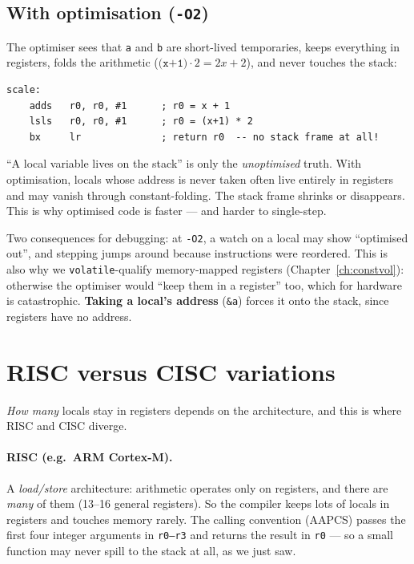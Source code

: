 \documentclass[11pt,a4paper,oneside]{book}
\newcommand{\code}[1]{\texttt{#1}}
\begin{document}
\subsection{With optimisation (\texttt{-O2})}
The optimiser sees that \code{a} and \code{b} are short-lived temporaries,
keeps everything in registers, folds the arithmetic ($\texttt{(x+1)}\cdot 2 =
2x+2$), and never touches the stack:
\begin{lstlisting}[style=asm]
scale:
    adds   r0, r0, #1      ; r0 = x + 1
    lsls   r0, r0, #1      ; r0 = (x+1) * 2
    bx     lr              ; return r0  -- no stack frame at all!
\end{lstlisting}

\begin{keyidea}
``A local variable lives on the stack'' is only the \emph{unoptimised} truth.
With optimisation, locals whose address is never taken often live entirely in
registers and may vanish through constant-folding. The stack frame shrinks or
disappears. This is why optimised code is faster --- and harder to single-step.
\end{keyidea}

\begin{warning}
Two consequences for debugging: at \code{-O2}, a watch on a local may show
``optimised out'', and stepping jumps around because instructions were
reordered. This is also why we \code{volatile}-qualify memory-mapped registers
(Chapter~\ref{ch:constvol}): otherwise the optimiser would ``keep them in a
register'' too, which for hardware is catastrophic. \textbf{Taking a local's
address} (\code{\&a}) forces it onto the stack, since registers have no address.
\end{warning}

\section{RISC versus CISC variations}
\emph{How many} locals stay in registers depends on the architecture, and this
is where RISC and CISC diverge.

\paragraph{RISC (e.g.\ ARM Cortex-M).} A \emph{load/store} architecture:
arithmetic operates only on registers, and there are \emph{many} of them
(13--16 general registers). So the compiler keeps lots of locals in registers
and touches memory rarely. The calling convention (AAPCS) passes the first four
integer arguments in \code{r0--r3} and returns the result in \code{r0} --- so a
small function may never spill to the stack at all, as we just saw.
\end{document}
